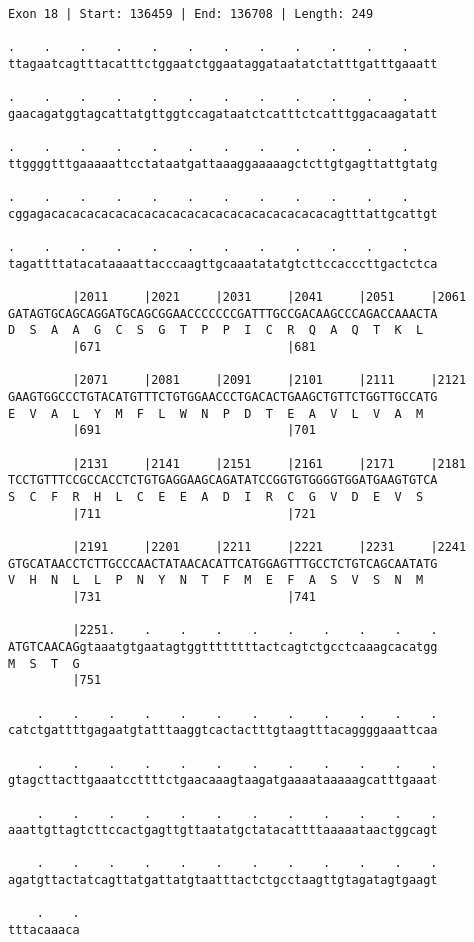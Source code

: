 \documentclass{article}
\begin{document}
\newpage
\begin{Verbatim}
Exon 18 | Start: 136459 | End: 136708 | Length: 249
 
.    .    .    .    .    .    .    .    .    .    .    .    
ttagaatcagtttacatttctggaatctggaataggataatatctatttgatttgaaatt
  
.    .    .    .    .    .    .    .    .    .    .    .    
gaacagatggtagcattatgttggtccagataatctcatttctcatttggacaagatatt
  
.    .    .    .    .    .    .    .    .    .    .    .    
ttggggtttgaaaaattcctataatgattaaaggaaaaagctcttgtgagttattgtatg
  
.    .    .    .    .    .    .    .    .    .    .    .    
cggagacacacacacacacacacacacacacacacacacacacacagtttattgcattgt
  
.    .    .    .    .    .    .    .    .    .    .    .    
tagattttatacataaaattacccaagttgcaaatatatgtcttccacccttgactctca
  
         |2011     |2021     |2031     |2041     |2051     |2061
GATAGTGCAGCAGGATGCAGCGGAACCCCCCCGATTTGCCGACAAGCCCAGACCAAACTA
D  S  A  A  G  C  S  G  T  P  P  I  C  R  Q  A  Q  T  K  L  
         |671                          |681                 
  
         |2071     |2081     |2091     |2101     |2111     |2121
GAAGTGGCCCTGTACATGTTTCTGTGGAACCCTGACACTGAAGCTGTTCTGGTTGCCATG
E  V  A  L  Y  M  F  L  W  N  P  D  T  E  A  V  L  V  A  M  
         |691                          |701                 
  
         |2131     |2141     |2151     |2161     |2171     |2181
TCCTGTTTCCGCCACCTCTGTGAGGAAGCAGATATCCGGTGTGGGGTGGATGAAGTGTCA
S  C  F  R  H  L  C  E  E  A  D  I  R  C  G  V  D  E  V  S  
         |711                          |721                 
  
         |2191     |2201     |2211     |2221     |2231     |2241
GTGCATAACCTCTTGCCCAACTATAACACATTCATGGAGTTTGCCTCTGTCAGCAATATG
V  H  N  L  L  P  N  Y  N  T  F  M  E  F  A  S  V  S  N  M  
         |731                          |741                 
  
         |2251.    .    .    .    .    .    .    .    .    .
ATGTCAACAGgtaaatgtgaatagtggttttttttactcagtctgcctcaaagcacatgg
M  S  T  G                                                  
         |751                                               
  
    .    .    .    .    .    .    .    .    .    .    .    .
catctgattttgagaatgtatttaaggtcactactttgtaagtttacaggggaaattcaa
  
    .    .    .    .    .    .    .    .    .    .    .    .
gtagcttacttgaaatccttttctgaacaaagtaagatgaaaataaaaagcatttgaaat
  
    .    .    .    .    .    .    .    .    .    .    .    .
aaattgttagtcttccactgagttgttaatatgctatacattttaaaaataactggcagt
  
    .    .    .    .    .    .    .    .    .    .    .    .
agatgttactatcagttatgattatgtaatttactctgcctaagttgtagatagtgaagt
  
    .    .
tttacaaaca
\end{Verbatim}
\end{document}
